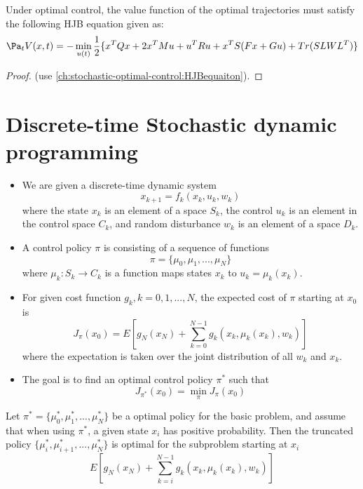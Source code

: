 \begin{refsection}
\begin{theorem}
	Under optimal control, the value function of the optimal trajectories must satisfy the following HJB equation given as:
	$$\Pa_t V(x,t) = -\min_{u(t)} \frac{1}{2}\{x^TQx + 2x^TMu + u^TRu + x^TS(Fx + Gu) + Tr(SLWL^T) \}$$ 
\end{theorem}
\begin{proof}
(use \autoref{ch:stochastic-optimal-control:HJBequaiton}).	
\end{proof}



\section{Discrete-time Stochastic dynamic programming }
\begin{definition}\cite[12]{bertsekas2012dynamic}\hfill
	\begin{itemize}
		\item We are given a discrete-time dynamic system
		$$x_{k+1}  =  f_k(x_k,u_k,w_k)$$
		where the state $x_k$ is an element of a space $S_k$, the control $u_k$ is an element in the control space $C_k$, and random disturbance $w_k$ is an element of a space $D_k$.
		\item A control policy $\pi$ is consisting of a sequence of functions
		$$\pi = \{\mu_0,\mu_1,...,\mu_N\}$$
		where $\mu_k:S_k\to C_k$ is a function  maps states $x_k$ to $u_k = \mu_k(x_k)$.
		\item For given cost function $g_k,k=0,1,...,N$, the expected cost of $\pi$ starting at $x_0$ is
		$$J_\pi(x_0) = E[g_N(x_N) + \sum_{k=0}^{N-1} g_k(x_k,\mu_k(x_k),w_k)]$$
		where the expectation is taken over the joint distribution of all $w_k$ and $x_k$.
		\item The goal is to find an optimal control policy $\pi^*$ such that 
		$$J_{\pi^*}(x_0) = \min_{\pi} J_\pi(x_0)$$
	\end{itemize}
\end{definition}


\begin{theorem}
\cite[18]{bertsekas2012dynamic}
Let $\pi^* = \{\mu_0^*,\mu_1^*,...,\mu_N^*\}$ be a optimal policy for the basic problem, and assume that when using $\pi^*$, a given state $x_i$ has positive probability. Then the truncated policy $\{\mu_i^*,\mu_{i+1}^*,...,\mu_N^*\}$ is optimal for the subproblem starting at $x_i$
$$E[g_N(x_N) + \sum_{k=i}^{N-1} g_k(x_k,\mu_k(x_k),w_k)]$$
\end{theorem}




\end{refsection}
